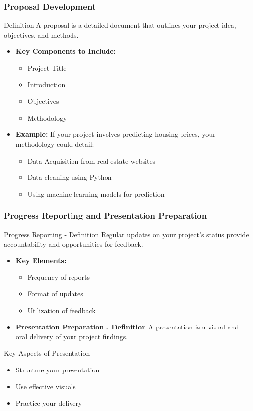 \documentclass[aspectratio=169]{beamer}
\begin{document}
\begin{frame}[fragile]
    \frametitle{Proposal Development}
    \begin{block}{Definition}
        A proposal is a detailed document that outlines your project idea, objectives, and methods.
    \end{block}
    \begin{itemize}
        \item \textbf{Key Components to Include:}
        \begin{itemize}
            \item Project Title
            \item Introduction
            \item Objectives
            \item Methodology
        \end{itemize}
        \item \textbf{Example:} 
        If your project involves predicting housing prices, your methodology could detail:
        \begin{itemize}
            \item Data Acquisition from real estate websites
            \item Data cleaning using Python
            \item Using machine learning models for prediction
        \end{itemize}
    \end{itemize}
\end{frame}

\begin{frame}[fragile]
    \frametitle{Progress Reporting and Presentation Preparation}
    \begin{block}{Progress Reporting - Definition}
        Regular updates on your project's status provide accountability and opportunities for feedback.
    \end{block}
    \begin{itemize}
        \item \textbf{Key Elements:}
        \begin{itemize}
            \item Frequency of reports
            \item Format of updates
            \item Utilization of feedback
        \end{itemize}
        \item \textbf{Presentation Preparation - Definition}
        A presentation is a visual and oral delivery of your project findings.
    \end{itemize}
    \begin{block}{Key Aspects of Presentation}
        \begin{itemize}
            \item Structure your presentation
            \item Use effective visuals
            \item Practice your delivery
        \end{itemize}
    \end{block}
\end{frame}
\end{document}
